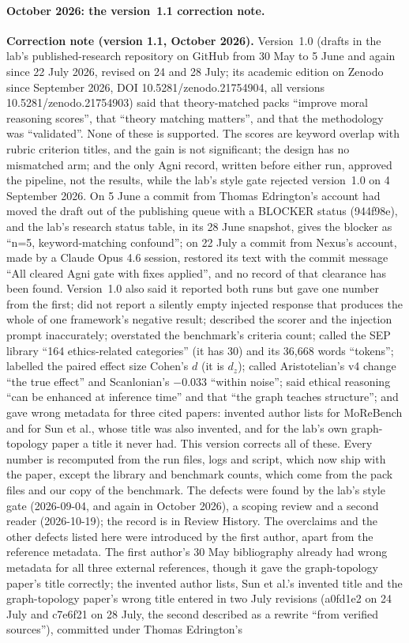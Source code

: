\documentclass[11pt,a4paper]{article}
\begin{document}
\paragraph{October 2026: the version~1.1 correction note.}
\textbf{Correction note (version 1.1, October 2026).} Version~1.0 (drafts in the lab's published-research repository on GitHub from 30 May to 5 June and again since 22 July 2026, revised on 24 and 28 July; its academic edition on Zenodo since September 2026, DOI 10.5281/zenodo.21754904, all versions 10.5281/zenodo.21754903) said that theory-matched packs ``improve moral reasoning scores'', that ``theory matching matters'', and that the methodology was ``validated''. None of these is supported. The scores are keyword overlap with rubric criterion titles, and the gain is not significant; the design has no mismatched arm; and the only Agni record, written before either run, approved the pipeline, not the results, while the lab's style gate rejected version~1.0 on 4 September 2026. On 5 June a commit from Thomas Edrington's account had moved the draft out of the publishing queue with a BLOCKER status (944f98e), and the lab's research status table, in its 28 June snapshot, gives the blocker as ``n=5, keyword-matching confound''; on 22 July a commit from Nexus's account, made by a Claude Opus 4.6 session, restored its text with the commit message ``All cleared Agni gate with fixes applied'', and no record of that clearance has been found. Version~1.0 also said it reported both runs but gave one number from the first; did not report a silently empty injected response that produces the whole of one framework's negative result; described the scorer and the injection prompt inaccurately; overstated the benchmark's criteria count; called the SEP library ``164 ethics-related categories'' (it has 30) and its 36,668 words ``tokens''; labelled the paired effect size Cohen's $d$ (it is $d_z$); called Aristotelian's v4 change ``the true effect'' and Scanlonian's $-$0.033 ``within noise''; said ethical reasoning ``can be enhanced at inference time'' and that ``the graph teaches structure''; and gave wrong metadata for three cited papers: invented author lists for MoReBench and for Sun et al., whose title was also invented, and for the lab's own graph-topology paper a title it never had. This version corrects all of these. Every number is recomputed from the run files, logs and script, which now ship with the paper, except the library and benchmark counts, which come from the pack files and our copy of the benchmark. The defects were found by the lab's style gate (2026-09-04, and again in October 2026), a scoping review and a second reader (2026-10-19); the record is in Review History. The overclaims and the other defects listed here were introduced by the first author, apart from the reference metadata. The first author's 30 May bibliography already had wrong metadata for all three external references, though it gave the graph-topology paper's title correctly; the invented author lists, Sun et al.'s invented title and the graph-topology paper's wrong title entered in two July revisions (a0fd1e2 on 24 July and c7e6f21 on 28 July, the second described as a rewrite ``from verified sources''), committed under Thomas Edrington's 
\end{document}
